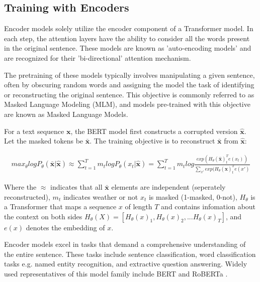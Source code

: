 \subsection{Training with Encoders}
Encoder models solely utilize the encoder component of a Transformer model. In each step, the attention layers have the ability to consider all the words present in the original sentence. These models are known as 'auto-encoding models' and are recognized for their 'bi-directional' attention mechanism.

The pretraining of these models typically involves manipulating a given sentence, often by obscuring random words and assigning the model the task of identifying or reconstructing the original sentence. This objective is commonly referred to as Masked Language Modeling (MLM), and models pre-trained with this objective are known as Masked Language Models.

For a text sequence $\textbf{x}$, the BERT model first constructs a corrupted version $\hat{\textbf{x}}$. Let the masked tokens be $\bar{\textbf{x}}$. The training objective is to reconstruct $\bar{\textbf{x}}$ from $\hat{\textbf{x}}$:

\begin{align}
max_{\theta}logP_{\theta}(\bar{\textbf{x}}|\hat{\textbf{x}})\approx \sum_{t=1}^Tm_tlogP_{\theta}(x_t|\hat{\textbf{x}})
=\sum_{t=1}^Tm_tlog\frac{exp(H_{\theta}(\hat{\textbf{x}})_t^Te(x_t))}{\sum_{x\prime} {exp(H_{\theta}(\hat{\textbf{x}})_t^Te(x\prime)}}
\end{align}

Where the $\approx$ indicates that all $\bar{\textbf{x}}$ elements are independent (seperately reconstructed), $m_t$ indicates weather or not $x_t$ is masked (1-masked, 0-not), $H_{\theta}$ is a Transformer that maps a sequence $x$ of length $T$ and contains infomation about the context on both sides $H_{\theta}(X)=[H_{\theta}(x)_1, H_{\theta}(x)_2,...H_{\theta}(x)_T]$, and $e(x)$ denotes the embedding of $x$.

Encoder models excel in tasks that demand a comprehensive understanding of the entire sentence. These tasks include sentence classification, word classification tasks e.g. named entity recognition, and extractive question answering. Widely used representatives of this model family include BERT \cite{devlin2018bert} and RoBERTa \cite{liu2019roberta}.

